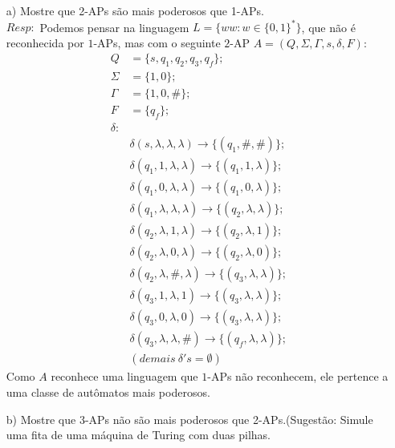 \documentclass{homework}
\begin{document}
	\begin{enumerate}
		\item[a)] Mostre que 2-APs são mais poderosos que 1-APs.\\
		$Resp:$ Podemos pensar na linguagem $L = \{ww: w \in \{0,1\}^*\}$, que não é reconhecida por $1$-APs, mas com o seguinte $2$-AP $A = (Q,\Sigma,\Gamma,s,\delta,F)$:\\
		\begin{align*}
			Q & = \{s,q_1,q_2,q_3,q_f\};\\
			\Sigma & = \{1,0\};\\
			\Gamma & = \{1,0,\#\};\\
			F & = \{q_f\};\\
			\delta : \\
			&\delta(s, \lambda, \lambda, \lambda) \rightarrow \{(q_1,\#,\#)\};\\
			&\delta(q_1, 1, \lambda, \lambda) \rightarrow \{(q_1,1,\lambda)\};\\
			&\delta(q_1, 0, \lambda, \lambda) \rightarrow \{(q_1,0,\lambda)\};\\
			&\delta(q_1, \lambda, \lambda, \lambda) \rightarrow \{(q_2,\lambda,\lambda)\};\\
			&\delta(q_2, \lambda, 1, \lambda) \rightarrow \{(q_2,\lambda,1)\};\\
			&\delta(q_2, \lambda, 0, \lambda) \rightarrow \{(q_2,\lambda,0)\};\\
			&\delta(q_2, \lambda, \#,\lambda) \rightarrow \{(q_3,\lambda,\lambda)\};\\
			&\delta(q_3, 1, \lambda, 1) \rightarrow \{(q_3,\lambda,\lambda)\};\\
			&\delta(q_3, 0, \lambda, 0) \rightarrow \{(q_3,\lambda,\lambda)\};\\
			&\delta(q_3, \lambda, \lambda, \#) \rightarrow \{(q_f,\lambda,\lambda)\};\\
			&(demais\ \delta 's = \emptyset)
		\end{align*}
		Como $A$ reconhece uma linguagem que $1$-APs não reconhecem, ele pertence a uma classe de autômatos mais poderosos.				
		\item[b)] Mostre que 3-APs não são mais poderosos que 2-APs.(Sugestão: Simule uma fita de uma máquina de Turing com duas pilhas.
	\end{enumerate}
\end{document}
